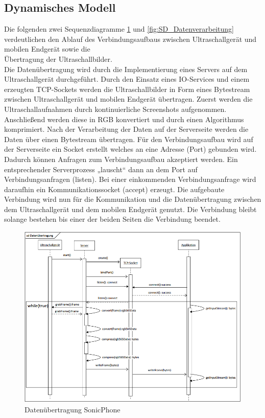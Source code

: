 \subsection{Dynamisches Modell}
Die folgenden zwei Sequenzdiagramme  \ref{fig:SD_Datenuebertragung} und \ref{fig:SD_Datenverarbeitung}  verdeutlichen den Ablauf des Verbindungsaufbaus zwischen Ultraschallgerät und mobilen Endgerät sowie die \\ Übertragung der Ultraschallbilder.\\
Die Datenübertragung wird durch die Implementierung eines Servers auf dem Ultraschallgerät durchgeführt. Durch den Einsatz eines IO-Services und einem erzeugten TCP-Sockets werden die Ultraschallbilder in Form eines Bytestream zwischen Ultraschallgerät und mobilen Endgerät übertragen. Zuerst werden die Ultraschallaufnahmen durch kontinuierliche Screenshots aufgenommen. Anschließend werden diese in RGB konvertiert und durch einen Algorithmus komprimiert. Nach der Verarbeitung der Daten auf der Serverseite werden die Daten über einen Bytestream übertragen. Für den Verbindungsaufbau wird auf der Serverseite ein Socket erstellt welches an eine Adresse (Port) gebunden wird. Dadurch können Anfragen zum Verbindungsaufbau akzeptiert werden. Ein entsprechender Serverprozess „lauscht“ dann an dem Port auf Verbindungsanfragen (listen). Bei einer einkommenden Verbindungsanfrage wird daraufhin ein Kommunikationssocket (accept) erzeugt. Die aufgebaute Verbindung wird nun für die Kommunikation und die Datenübertragung zwischen dem Ultraschallgerät und dem mobilen Endgerät genutzt. Die Verbindung bleibt solange bestehen bis einer der beiden Seiten die Verbindung beendet. 

\begin{figure}[H] 
\centering
\includegraphics[width=1\textwidth]{Bilder/objektorientierteAnalyseundEntwurf/SD_Datenuebertragung}
\caption{{\small Datenübertragung SonicPhone}}
\label{fig:SD_Datenuebertragung}
\end{figure}

